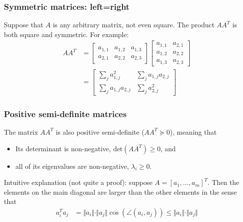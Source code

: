 \documentclass{beamer}
\begin{document}

\begin{frame}
  \frametitle{Symmetric matrices: left=right}

  Suppose that $A$ is any arbitrary matrix, not even square.  The
  product $AA^T$ is both square and symmetric.  For example:
  \begin{align*}
    AA^T &= \left[\begin{array}{ccc}a_{1,1}&a_{1,2}&a_{1,3}\\a_{2,1}&a_{2,2}&a_{2,3}\end{array}\right]
    \left[\begin{array}{cc}a_{1,1}&a_{2,1}\\a_{1,2}&a_{2,2}\\a_{1,3}&a_{2,3}\end{array}\right]\\
    &=
    \left[\begin{array}{cc}\sum_ja_{1,j}^2&\sum_ja_{1,j}a_{2,j}\\\sum_ja_{1,j}a_{2,j}&\sum_ja_{2,j}^2
      \end{array}\right]
  \end{align*}
\end{frame}

\begin{frame}
  \frametitle{Positive semi-definite matrices}

  The matrix $AA^T$ is also positive semi-definite ($AA^T\succeq 0$),
  meaning that
  \begin{itemize}
  \item Its determinant is non-negative, $\mbox{det}(AA^T)\ge 0$, and
  \item all of its eigenvalues are non-negative, $\lambda_i \ge 0$.
  \end{itemize}
  Intuitive explanation (not quite a proof): suppose
  $A=[a_1,\ldots,a_m]^T$.  Then the elements on the main diagonal are
  larger than the other elements in the sense that
  \begin{align*}
    a_i^Ta_j &= \Vert a_i\Vert\cdot\Vert a_j\Vert\cos\left(\angle(a_i,a_j)\right)\le\Vert a_i\Vert\cdot
    \Vert a_j\Vert
  \end{align*}
\end{frame}
\end{document}
